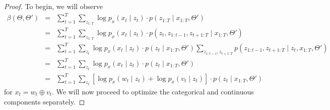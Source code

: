 \documentclass{amsart}
\begin{document}
\begin{proof}
To begin, we will observe 
\begin{eqnarray*}
\beta(\Theta,\Theta') &=& \sum_{t=1}^T\sum_{z_{1:T}}\log p_x(x_t\mid z_t)\cdot p(z_{1:T}\mid x_{1:T},\Theta')\\
&=& \sum_{t=1}^T\sum_{z_{1:T}}\log p_x(x_t\mid z_t)\cdot p(z_t,z_{1:t-1},z_{t+1:T}\mid x_{1:T},\Theta')\\
&=& \sum_{t=1}^T\sum_{z_t}\log p_x(x_t\mid z_t)\cdot p(z_t\mid x_{1:T},\Theta')\sum_{z_{1:t-1},z_{t+1:T}}p(z_{1:t-1},z_{t+1:T}\mid z_t,x_{1:T},\Theta')\\
&=& \sum_{t=1}^T\sum_{z_t}\log p_x(x_t\mid z_t)\cdot p(z_t\mid x_{1:T},\Theta')\\
&=& \sum_{t=1}^T\sum_{z_t}\left[\log p_x(w_t\mid z_t)+\log p_x(v_t\mid z_t)\right]\cdot p(z_t\mid x_{1:T},\Theta')
\end{eqnarray*}
for $x_t=w_t\oplus v_t$.  We will now proceed to optimize the categorical and continuous components separately.


\end{proof}
\end{document}
